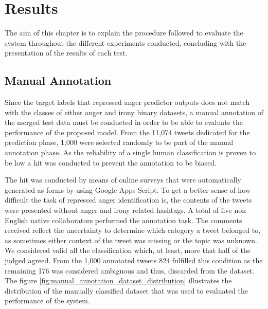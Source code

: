 \chapter{Results}

The aim of this chapter is to explain the procedure followed to evaluate the system throughout the different experiments conducted, concluding with the presentation of the results of each test.

\section{Manual Annotation}

Since the target labels that repressed anger predictor outputs does not match with the classes of either anger and irony binary datasets, a manual annotation of the merged test data must be conducted in order to be able to evaluate the performance of the proposed model. From the 11,074 tweets dedicated for the prediction phase, 1,000 were selected randomly to be part of the manual annotation phase. As the reliability of a single human classification is proven to be low \cite{gonzalez2011identifying} a \acrshort{hit} was conducted to prevent the annotation to be biased.

The \acrshort{hit} was conducted by means of online surveys that were automatically generated as forms by using Google Apps Script. To get a better sense of how difficult the task of repressed anger identification is, the contents of the tweets were presented without anger and irony related hashtags. A total of five non English native collaborators performed the annotation task. The comments received reflect the uncertainty to determine which category a tweet belonged to, as sometimes either context of the tweet was missing or the topic was unknown. We considered valid all the classification which, at least, more that half of the judged agreed. From the 1,000 annotated tweets 824 fulfilled this condition as the remaining 176 was considered ambiguous and thus, discarded from the dataset. The figure \ref{fig:manual_annotation_dataset_distribution} illustrates the distribution of the manually classified dataset that was used to evaluated the performance of the system.

